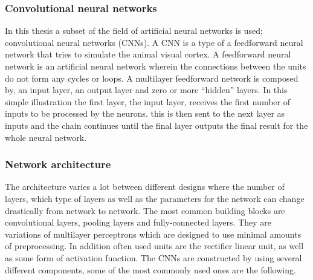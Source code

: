 \subsubsection{Convolutional neural networks}

In this thesis a subset of the field of artificial neural networks is used; convolutional neural networks (CNNs). A CNN is a type of a feedforward neural network  that tries to simulate the animal visual cortex. A feedforward neural network is an artificial neural network wherein the connections between the units do not form any cycles or loops. A multilayer feedforward network is composed by, an input layer, an output layer and zero or more ``hidden'' layers. In this simple illustration the first layer, the input layer, receives the first number of inputs to be processed by the neurons. this is then sent to the next layer as inputs and the chain continues until the final layer outputs the final result for the whole neural network. 

\subsubsection{Network architecture}
The architecture varies a lot between different designs where the number of layers, which type of layers as well as the parameters for the network can change drastically from network to network. The most common building blocks are convolutional layers, pooling layers and fully-connected layers. They are variations of multilayer perceptrons which are designed to use minimal amounts of preprocessing. In addition often used units are the rectifier linear unit, as well as some form of activation function. The CNNs are constructed by using several different components, some of the most commonly used ones are the following. \\

